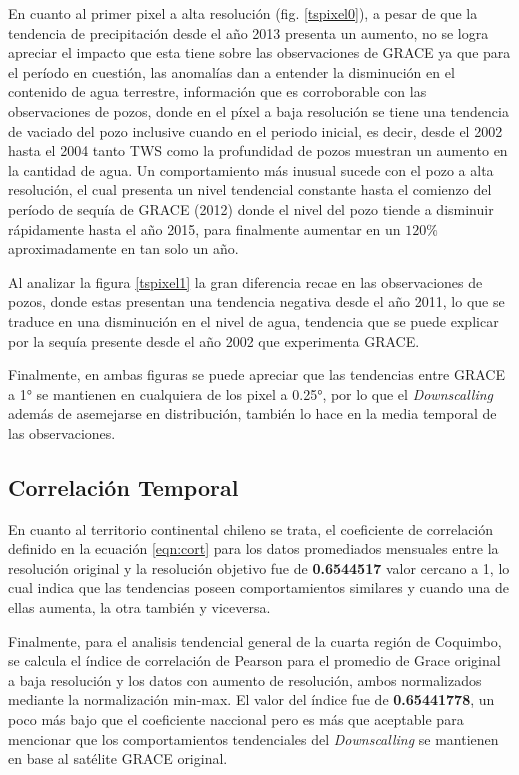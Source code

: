 En cuanto al primer pixel a alta resolución (fig. \ref{tspixel0}), a pesar de que la tendencia de precipitación desde el año 2013 presenta un aumento, no se logra apreciar el impacto que esta tiene sobre las observaciones de GRACE
ya que para el período en cuestión, las anomalías dan a entender la disminución en el contenido de agua terrestre, información que es corroborable con las observaciones de pozos, donde en el píxel a baja resolución se tiene una 
tendencia de vaciado del pozo inclusive cuando en el periodo inicial, es decir, desde el 2002 hasta el 2004 tanto TWS como la profundidad de pozos muestran un aumento en la cantidad de agua. Un comportamiento más inusual sucede con el pozo a alta resolución,
el cual presenta un nivel tendencial constante hasta el comienzo del período de sequía de GRACE (2012) donde el nivel del pozo tiende a disminuir rápidamente hasta el año 2015, para finalmente aumentar en un $120\%$ aproximadamente en tan solo un año. 

Al analizar la figura \ref{tspixel1} la gran diferencia recae en las observaciones de pozos, donde estas presentan una tendencia negativa desde el año 2011, lo que se traduce en una disminución en el nivel de agua, tendencia que se puede
explicar por la sequía presente desde el año 2002 que experimenta GRACE.

Finalmente, en ambas figuras se puede apreciar que las tendencias entre GRACE a 1° se mantienen en cualquiera de los pixel a 0.25°, por lo que el \textit{Downscalling} además de asemejarse en distribución, también lo hace 
en la media temporal de las observaciones.


\subsection{Correlación Temporal}
En cuanto al territorio continental chileno se trata, el coeficiente de correlación definido en la ecuación \ref{eqn:cort} para los datos promediados mensuales entre la resolución original y la resolución objetivo fue de
\textbf{0.6544517} valor cercano a 1, lo cual indica que las tendencias poseen comportamientos similares y cuando una de ellas aumenta, la otra también y viceversa.

Finalmente, para el analisis tendencial general de la cuarta región de Coquimbo, se calcula el índice de correlación de Pearson 
para el promedio de Grace original a baja resolución y los datos con aumento de resolución, ambos normalizados mediante la normalización min-max. El valor del índice 
fue de \textbf{0.65441778}, un poco más bajo que el coeficiente naccional pero es más que aceptable para mencionar que los comportamientos tendenciales del \textit{Downscalling} se mantienen
en base al satélite GRACE original.

